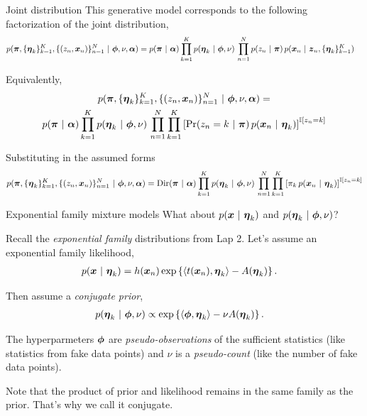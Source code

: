 \documentclass[aspectratio=169]{beamer}
\begin{document}
\begin{frame}{Joint distribution}
    This generative model corresponds to the following factorization of the joint distribution,
    \begin{align}
        p(\boldsymbol{\pi}, \{\boldsymbol{\eta}_k\}_{k=1}^K, \{(z_n, \boldsymbol{x}_n)\}_{n=1}^N ~\vert~ \boldsymbol{\phi}, \nu, \boldsymbol{\alpha}) 
        &= p(\boldsymbol{\pi} ~\vert~ \boldsymbol{\alpha}) \prod_{k=1}^K p(\boldsymbol{\eta}_k ~\vert~ \boldsymbol{\phi}, \nu) \, \prod_{n=1}^N p(z_n ~\vert~ \boldsymbol{\pi}) \, p(\boldsymbol{x}_n ~\vert~ \boldsymbol{z}_n, \{\boldsymbol{\eta}_k\}_{k=1}^K)
    \end{align}
    
    Equivalently, 
    \begin{multline}
        p(\boldsymbol{\pi}, \{\boldsymbol{\eta}_k\}_{k=1}^K, \{(z_n, \boldsymbol{x}_n)\}_{n=1}^N ~\vert~ \boldsymbol{\phi}, \nu, \boldsymbol{\alpha}) 
        = \\
        p(\boldsymbol{\pi} ~\vert~ \boldsymbol{\alpha}) \prod_{k=1}^K p(\boldsymbol{\eta}_k ~\vert~ \boldsymbol{\phi}, \nu) \, \prod_{n=1}^N \prod_{k=1}^K \left[ \Pr(z_n = k ~\vert~ \boldsymbol{\pi}) \, p(\boldsymbol{x}_n ~\vert~ \boldsymbol{\eta}_k) \right]^{\mathbb{I}[z_n = k]}
    \end{multline}
    
    Substituting in the assumed forms 
    \begin{align}
        p(\boldsymbol{\pi}, \{\boldsymbol{\eta}_k\}_{k=1}^K, \{(z_n, \boldsymbol{x}_n)\}_{n=1}^N ~\vert~ \boldsymbol{\phi}, \nu, \boldsymbol{\alpha}) 
        =
        \mathrm{Dir}(\boldsymbol{\pi} ~\vert~ \boldsymbol{\alpha}) \prod_{k=1}^K p(\boldsymbol{\eta}_k ~\vert~ \boldsymbol{\phi}, \nu) \, \prod_{n=1}^N \prod_{k=1}^K \left[ \pi_k \, p(\boldsymbol{x}_n ~\vert~ \boldsymbol{\eta}_k) \right]^{\mathbb{I}[z_n = k]}
    \end{align}
\end{frame}

\begin{frame}{Exponential family mixture models}
    What about $p(\boldsymbol{x} ~\vert~ \boldsymbol{\eta}_k)$ and $p(\boldsymbol{\eta}_k ~\vert~ \boldsymbol{\phi}, \nu)$?
    
    Recall the \textit{exponential family} distributions from Lap 2. Let's assume an exponential family likelihood,
    \begin{align}
        p(\boldsymbol{x} ~\vert~ \boldsymbol{\eta}_k) &= h(\boldsymbol{x}_n) \exp \left \{\langle t(\boldsymbol{x}_n), \boldsymbol{\eta}_k \rangle - A(\boldsymbol{\eta}_k) \right \}.
    \end{align}
    
    Then assume a \textit{conjugate prior},
    \begin{align}
        p(\boldsymbol{\eta}_k ~\vert~ \boldsymbol{\phi}, \nu) &\propto \exp \left \{ \langle \boldsymbol{\phi}, \boldsymbol{\eta}_k \rangle - \nu A(\boldsymbol{\eta}_k) \right \}.
    \end{align}
    
    The hyperparmeters $\boldsymbol{\phi}$ are \textit{pseudo-observations} of the sufficient statistics (like statistics from fake data points) and $\nu$ is a \textit{pseudo-count} (like the number of fake data points).
    
    Note that the product of prior and likelihood remains in the same family as the prior. That's why we call it conjugate.
\end{frame}
\end{document}
